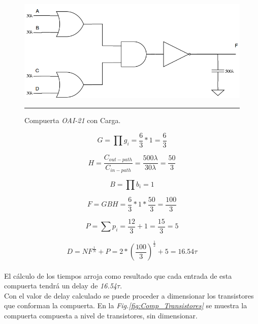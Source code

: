 \documentclass[12pt,a4paper]{article} %
\begin{document}
\begin{figure}[htbp]
  \centering
    \includegraphics[scale=0.4]{./OAI21_Cargas.png}
    \rule{35em}{0.5pt}
  \caption[IdealvsSim]{Compuerta \textit{OAI-21} con Carga.}
  \label{fig:OAI21_Cargas}
\end{figure}


\begin{equation}\label{eqn:esfuerzo_logico2}
G= \prod g_{i}= \frac{6}{3} * 1 = \frac{6}{3}
\end{equation}

\begin{equation}\label{eqn:esfuerzo_electrico2}
H= \frac{C_{out-path}}{C_{in-path}} = \frac{500\lambda}{30\lambda} = \frac{50}{3}
\end{equation}

\begin{equation}\label{eqn:esfuerzo_enramado2}
B= \prod b_{i} = 1
\end{equation}

\begin{equation}\label{eqn:esfuerzo2}
F = GBH = \frac{6}{3}*1*\frac{50}{3} = \frac{100}{3}
\end{equation}

\begin{equation}\label{eqn:delay_parasitico2}
P = \sum p_{i} = \frac{12}{3} + 1 = \frac{15}{3} = 5
\end{equation}

\begin{equation}\label{eqn:delay2}
D = NF^{\frac{1}{N}} + P = 2*(\frac{100}{3})^{\frac{1}{2}} + 5 = 16.54\tau
\end{equation}\\

El cálculo de los tiempos arroja como resultado que cada entrada de esta compuerta tendrá un delay de \textit{16.54$\tau$}.\\

Con el valor de delay calculado se puede proceder a dimensionar los transistores que conforman la compuerta. En la \textit{Fig.\ref{fig:Comp_Transistores}} se muestra la compuerta compuesta a nivel de transistores, sin dimensionar.\\
\end{document}
